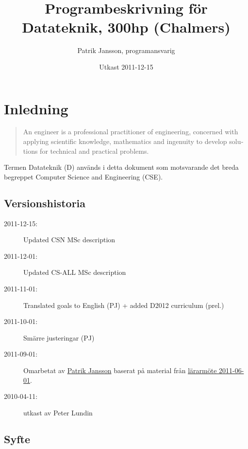 \documentclass[twocolumn]{article}
\title{Programbeskrivning för Datateknik, 300hp (Chalmers)}
\author{Patrik Jansson, programansvarig}
\date{Utkast 2011-12-15}
\begin{document}
\maketitle
\section{Inledning}

\begin{quote}
  \foreignlanguage{british}{An engineer is a professional practitioner
    of engineering, concerned with applying scientific knowledge,
    mathematics and ingenuity to develop solutions for technical and
    practical problems. }
\end{quote}

Termen Datateknik (D) används i detta dokument som motsvarande det
breda begreppet \foreignlanguage{british}{Computer Science and
  Engineering (CSE)}.

\subsection*{Versionshistoria}
{\small
\begin{description}
\item[2011-12-15:] Updated CSN MSc description
\item[2011-12-01:] Updated CS-ALL MSc description
\item[2011-11-01:] Translated goals to English (PJ) + added D2012 curriculum (prel.)
\item[2011-10-01:] Smärre justeringar (PJ)
\item[2011-09-01:] Omarbetat av \href{http://www.chalmers.se/cse/EN/people/jansson-patrik}{Patrik Jansson} baserat på material från 
\href{http://wiki.portal.chalmers.se/cse/pmwiki.php/PAD/L%C3%A4rarm%C3%B6teVT2011}{lärarmöte 2011-06-01}.
\item[2010-04-11:] utkast av Peter Lundin
\end{description}
}

\subsection{Syfte} 
\end{document}
